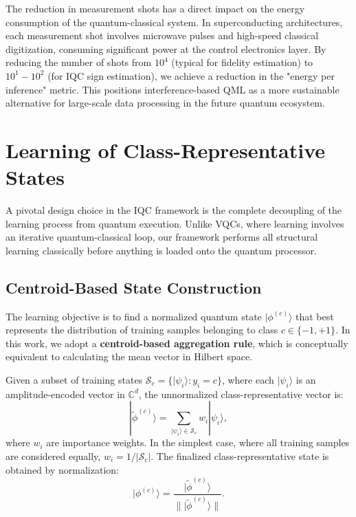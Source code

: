 \documentclass[conference]{IEEEtran}
\begin{document}
The reduction in measurement shots has a direct impact on the energy consumption of the quantum-classical system. In superconducting architectures, each measurement shot involves microwave pulses and high-speed classical digitization, consuming significant power at the control electronics layer. By reducing the number of shots from $10^4$ (typical for fidelity estimation) to $10^1-10^2$ (for IQC sign estimation), we achieve a reduction in the "energy per inference" metric. This positions interference-based QML as a more sustainable alternative for large-scale data processing in the future quantum ecosystem.

\section{Learning of Class-Representative States}

A pivotal design choice in the IQC framework is the complete decoupling of the learning process from quantum execution. Unlike VQCs, where learning involves an iterative quantum-classical loop, our framework performs all structural learning classically before anything is loaded onto the quantum processor.

\subsection{Centroid-Based State Construction}

The learning objective is to find a normalized quantum state $|\phi^{(c)}\rangle$ that best represents the distribution of training samples belonging to class $c \in \{-1, +1\}$. In this work, we adopt a \textbf{centroid-based aggregation rule}, which is conceptually equivalent to calculating the mean vector in Hilbert space.

Given a subset of training states $\mathcal{S}_c = \{|\psi_i\rangle : y_i = c\}$, where each $|\psi_i\rangle$ is an amplitude-encoded vector in $\mathbb{C}^d$, the unnormalized class-representative vector is:
\begin{equation}
| \tilde{\phi}^{(c)} \rangle = \sum_{|\psi_i\rangle \in \mathcal{S}_c} w_i |\psi_i\rangle,
\end{equation}
where $w_i$ are importance weights. In the simplest case, where all training samples are considered equally, $w_i = 1/|\mathcal{S}_c|$. The finalized class-representative state is obtained by normalization:
\begin{equation}
|\phi^{(c)}\rangle = \frac{| \tilde{\phi}^{(c)} \rangle}{\| | \tilde{\phi}^{(c)} \rangle \|}.
\end{equation}
\end{document}
